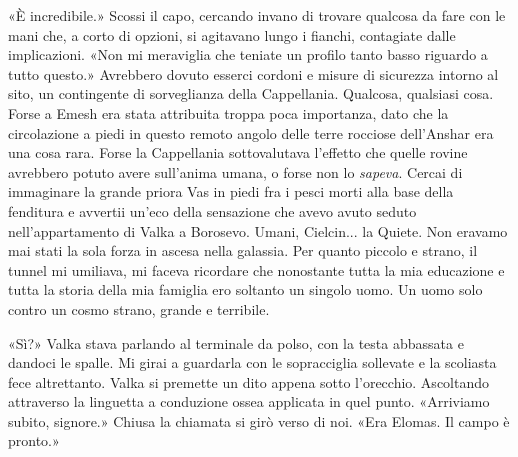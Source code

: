 «È incredibile.» Scossi il capo, cercando invano di trovare qualcosa da
fare con le mani che, a corto di opzioni, si agitavano lungo i fianchi,
contagiate dalle implicazioni. «Non mi meraviglia che teniate un profilo
tanto basso riguardo a tutto questo.» Avrebbero dovuto esserci cordoni e
misure di sicurezza intorno al sito, un contingente di sorveglianza
della Cappellania. Qualcosa, qualsiasi cosa. Forse a Emesh era stata
attribuita troppa poca importanza, dato che la circolazione a piedi in
questo remoto angolo delle terre rocciose dell'Anshar era una cosa rara.
Forse la Cappellania sottovalutava l'effetto che quelle rovine avrebbero
potuto avere sull'anima umana, o forse non lo \emph{sapeva}. Cercai di
immaginare la grande priora Vas in piedi fra i pesci morti alla base
della fenditura e avvertii un'eco della sensazione che avevo avuto
seduto nell'appartamento di Valka a Borosevo. Umani, Cielcin... la
Quiete. Non eravamo mai stati la sola forza in ascesa nella galassia.
Per quanto piccolo e strano, il tunnel mi umiliava, mi faceva ricordare
che {nonostante} tutta la mia educazione e tutta la storia della mia
famiglia ero soltanto un singolo uomo. Un uomo solo contro un cosmo
strano, grande e terribile.

«Sì?» Valka stava parlando al terminale da polso, con la testa abbassata
e dandoci le spalle. Mi girai a guardarla con le sopracciglia sollevate
e la scoliasta fece altrettanto. Valka si premette un dito appena sotto
l'orecchio. Ascoltando attraverso la linguetta a conduzione ossea
applicata in quel punto. «Arriviamo subito, signore.» Chiusa la chiamata
si girò verso di noi. «Era Elomas. Il campo è pronto.»


